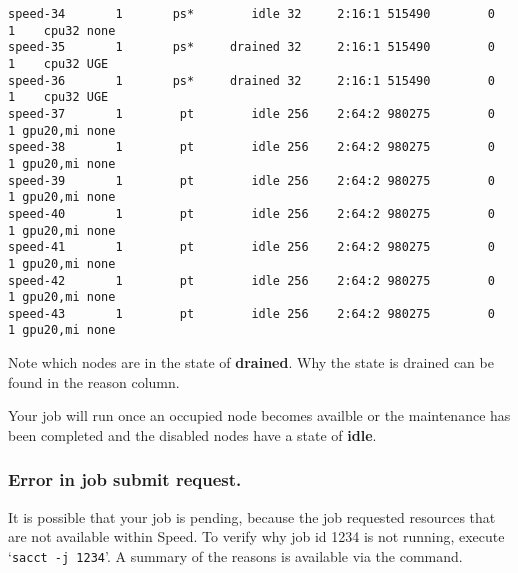 \begin{verbatim}
speed-34       1       ps*        idle 32     2:16:1 515490        0      1    cpu32 none
speed-35       1       ps*     drained 32     2:16:1 515490        0      1    cpu32 UGE
speed-36       1       ps*     drained 32     2:16:1 515490        0      1    cpu32 UGE
speed-37       1        pt        idle 256    2:64:2 980275        0      1 gpu20,mi none
speed-38       1        pt        idle 256    2:64:2 980275        0      1 gpu20,mi none
speed-39       1        pt        idle 256    2:64:2 980275        0      1 gpu20,mi none
speed-40       1        pt        idle 256    2:64:2 980275        0      1 gpu20,mi none
speed-41       1        pt        idle 256    2:64:2 980275        0      1 gpu20,mi none
speed-42       1        pt        idle 256    2:64:2 980275        0      1 gpu20,mi none
speed-43       1        pt        idle 256    2:64:2 980275        0      1 gpu20,mi none
\end{verbatim}
\normalsize

Note which nodes are in the state of \textbf{drained}. Why the state is drained can be found in the reason column.

Your job will run once an occupied node becomes availble or the maintenance has been completed and the disabled nodes have a state of \textbf{idle}.

\subsubsection{Error in job submit request.}

It is possible that your job is pending, because the job requested resources that are not available within Speed.
To verify why job id 1234 is not running, execute `\verb!sacct -j 1234!'.
A summary of the reasons is available via the  command.
